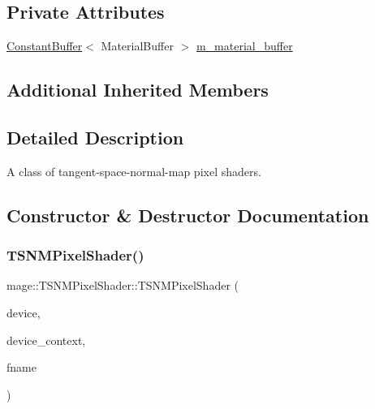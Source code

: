 \subsection*{Private Attributes}
\begin{DoxyCompactItemize}
\item 
\hyperlink{structmage_1_1_constant_buffer}{Constant\+Buffer}$<$ Material\+Buffer $>$ \hyperlink{classmage_1_1_t_s_n_m_pixel_shader_a44a37625ffb8de2ace98b9457972e030}{m\+\_\+material\+\_\+buffer}
\end{DoxyCompactItemize}
\subsection*{Additional Inherited Members}


\subsection{Detailed Description}
A class of tangent-\/space-\/normal-\/map pixel shaders. 

\subsection{Constructor \& Destructor Documentation}
\hypertarget{classmage_1_1_t_s_n_m_pixel_shader_af5ff9bfc033ea0fc1cf4c747cbe2c3c9}{}\label{classmage_1_1_t_s_n_m_pixel_shader_af5ff9bfc033ea0fc1cf4c747cbe2c3c9} 
\subsubsection{\texorpdfstring{T\+S\+N\+M\+Pixel\+Shader()}{TSNMPixelShader()}\hspace{0.1cm}{\footnotesize\ttfamily [1/4]}}
{\footnotesize\ttfamily mage\+::\+T\+S\+N\+M\+Pixel\+Shader\+::\+T\+S\+N\+M\+Pixel\+Shader (\begin{DoxyParamCaption}\item[{I\+D3\+D11\+Device2 $\ast$}]{device,  }\item[{I\+D3\+D11\+Device\+Context2 $\ast$}]{device\+\_\+context,  }\item[{const wstring \&}]{fname }\end{DoxyParamCaption})\hspace{0.3cm}{\ttfamily [explicit]}}

